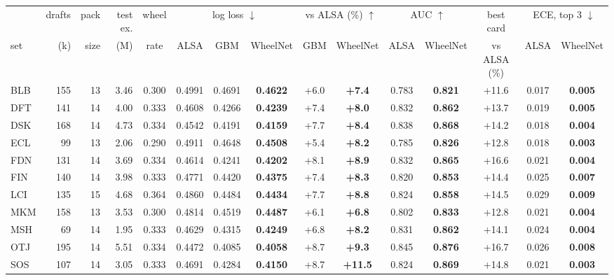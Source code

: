 \begin{tabular}{lrrrc ccc cc cc c cc}
\toprule
 & drafts & pack & test ex. & wheel & \multicolumn{3}{c}{log loss $\downarrow$} & \multicolumn{2}{c}{vs ALSA (\%) $\uparrow$} & \multicolumn{2}{c}{AUC $\uparrow$} & best card & \multicolumn{2}{c}{ECE, top 3 $\downarrow$} \\
\cmidrule(lr){6-8}\cmidrule(lr){9-10}\cmidrule(lr){11-12}\cmidrule(lr){13-13}\cmidrule(lr){14-15}
set & (k) & size & (M) & rate & ALSA & GBM & WheelNet & GBM & WheelNet & ALSA & WheelNet & vs ALSA (\%) & ALSA & WheelNet \\
\midrule
BLB & 155 & 13 & 3.46 & 0.300 & 0.4991 & 0.4691 & \textbf{0.4622} & +6.0 & \textbf{+7.4} & 0.783 & \textbf{0.821} & +11.6 & 0.017 & \textbf{0.005} \\
DFT & 141 & 14 & 4.00 & 0.333 & 0.4608 & 0.4266 & \textbf{0.4239} & +7.4 & \textbf{+8.0} & 0.832 & \textbf{0.862} & +13.7 & 0.019 & \textbf{0.005} \\
DSK & 168 & 14 & 4.73 & 0.334 & 0.4542 & 0.4191 & \textbf{0.4159} & +7.7 & \textbf{+8.4} & 0.838 & \textbf{0.868} & +14.2 & 0.018 & \textbf{0.004} \\
ECL & 99 & 13 & 2.06 & 0.290 & 0.4911 & 0.4648 & \textbf{0.4508} & +5.4 & \textbf{+8.2} & 0.785 & \textbf{0.826} & +12.8 & 0.018 & \textbf{0.003} \\
FDN & 131 & 14 & 3.69 & 0.334 & 0.4614 & 0.4241 & \textbf{0.4202} & +8.1 & \textbf{+8.9} & 0.832 & \textbf{0.865} & +16.6 & 0.021 & \textbf{0.004} \\
FIN & 140 & 14 & 3.98 & 0.333 & 0.4771 & 0.4420 & \textbf{0.4375} & +7.4 & \textbf{+8.3} & 0.820 & \textbf{0.853} & +14.4 & 0.025 & \textbf{0.007} \\
LCI & 135 & 15 & 4.68 & 0.364 & 0.4860 & 0.4484 & \textbf{0.4434} & +7.7 & \textbf{+8.8} & 0.824 & \textbf{0.858} & +14.5 & 0.029 & \textbf{0.009} \\
MKM & 158 & 13 & 3.53 & 0.300 & 0.4814 & 0.4519 & \textbf{0.4487} & +6.1 & \textbf{+6.8} & 0.802 & \textbf{0.833} & +12.8 & 0.021 & \textbf{0.004} \\
MSH & 69 & 14 & 1.95 & 0.333 & 0.4629 & 0.4315 & \textbf{0.4249} & +6.8 & \textbf{+8.2} & 0.831 & \textbf{0.862} & +14.1 & 0.024 & \textbf{0.004} \\
OTJ & 195 & 14 & 5.51 & 0.334 & 0.4472 & 0.4085 & \textbf{0.4058} & +8.7 & \textbf{+9.3} & 0.845 & \textbf{0.876} & +16.7 & 0.026 & \textbf{0.008} \\
SOS & 107 & 14 & 3.05 & 0.333 & 0.4691 & 0.4284 & \textbf{0.4150} & +8.7 & \textbf{+11.5} & 0.824 & \textbf{0.869} & +14.8 & 0.021 & \textbf{0.003} \\

\end{tabular}
